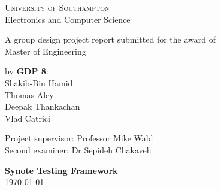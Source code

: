 \begin{titlepage}
    \begin{center}
        \vfill

        \large
        \textsc{University of Southampton}
        \\
        {Electronics and Computer Science}

        \vspace{3.0cm}

        \large
        {A group design project report submitted for the award of}\\
        {Master of Engineering}\\

        \vspace{3.0cm}

        by \textbf{GDP 8}:\\
        {Shakib-Bin Hamid}\\
        {Thomas Aley}\\
        {Deepak Thankachan}\\
        {Vlad Catrici}

        \vspace{3.0cm}

        \large
        Project supervisor: Professor Mike Wald\\
        Second examiner: Dr Sepideh Chakaveh\\

        \vspace{3.0cm}

        \textbf{Synote Testing Framework}\\
        \today

        \vfill

    \end{center}
\end{titlepage}
